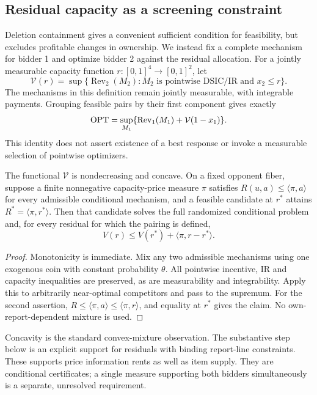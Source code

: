\subsection{Residual capacity as a screening constraint}\label{sec:residual}

Deletion containment gives a convenient sufficient condition for feasibility,
but excludes profitable changes in ownership. We instead fix a complete
mechanism for bidder 1 and optimize bidder 2 against the residual allocation.
For a jointly measurable capacity function $r:[0,1]^4\to[0,1]^2$, let
\[
\mathcal V(r)=\sup\{\operatorname{Rev}_2(M_2):
 M_2\text{ is pointwise DSIC/IR and }x_2\le r\}.
\]
The mechanisms in this definition remain jointly measurable, with integrable
payments. Grouping feasible pairs by their first component gives exactly
\[
\operatorname{OPT}=\sup_{M_1}\{\operatorname{Rev}_1(M_1)+\mathcal V(1-x_1)\}.
\]
This identity does not assert existence of a best response or invoke a
measurable selection of pointwise optimizers.

\begin{proposition}\label{prop:residual-value}
The functional $\mathcal V$ is nondecreasing and concave. On a fixed opponent
fiber, suppose a finite nonnegative capacity-price measure $\pi$ satisfies
$R(u,a)\le\langle\pi,a\rangle$ for every admissible conditional mechanism,
and a feasible candidate at $r^*$ attains
$R^*=\langle\pi,r^*\rangle$. Then that candidate solves the full randomized
conditional problem and, for every residual for which the pairing is defined,
\[
V(r)\le V(r^*)+\langle\pi,r-r^*\rangle.
\]
\end{proposition}
\begin{proof}
Monotonicity is immediate. Mix any two admissible mechanisms using one
exogenous coin with constant probability $\theta$. All pointwise incentive,
IR and capacity inequalities are preserved, as are measurability and
integrability. Apply this to arbitrarily near-optimal competitors and pass
to the supremum. For the second assertion,
$R\le\langle\pi,a\rangle\le\langle\pi,r\rangle$, and equality at $r^*$
gives the claim. No own-report-dependent mixture is used.
\end{proof}

Concavity is the standard convex-mixture observation. The substantive step
below is an explicit support for residuals with binding report-line
constraints. These supports price information rents as well as item supply.
They are conditional certificates; a single measure supporting both bidders
simultaneously is a separate, unresolved requirement.

